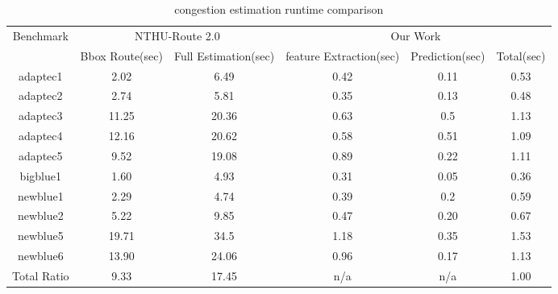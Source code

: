 \begin{table*}[htbp]
    \centering
    \caption{congestion estimation runtime comparison}
    \label{tab:runtime}
    \begin{tabular}{c|c|c|c|c|c}
        \toprule
        \multirow{2}{*}{Benchmark} & \multicolumn{2}{c|}{NTHU-Route 2.0 \cite{NTHU}} & \multicolumn{3}{c}{Our Work}        \\ \cline{2-6} 
                           & Bbox Route(sec)   & Full Estimation(sec)  & feature Extraction(sec) & Prediction(sec) & Total(sec) \\ \hline
        adaptec1           & 2.02         & 6.49             & 0.42                 & 0.11       & 0.53  \\ \hline
        adaptec2           & 2.74         & 5.81             & 0.35                 & 0.13       & 0.48  \\ \hline
        adaptec3           & 11.25        & 20.36            & 0.63                 & 0.5        & 1.13  \\ \hline
        adaptec4           & 12.16        & 20.62            & 0.58                 & 0.51       & 1.09  \\ \hline
        adaptec5           & 9.52         & 19.08            & 0.89                 & 0.22       & 1.11  \\ \hline
        bigblue1           & 1.60         & 4.93             & 0.31                 & 0.05       & 0.36  \\ \hline
        newblue1           & 2.29         & 4.74             & 0.39                 & 0.2        & 0.59  \\ \hline
        newblue2           & 5.22         & 9.85             & 0.47                 & 0.20       & 0.67  \\ \hline
        newblue5           & 19.71        & 34.5             & 1.18                 & 0.35       & 1.53  \\ \hline
        newblue6           & 13.90        & 24.06            & 0.96                 & 0.17       & 1.13  \\ \hline
        Total Ratio        & 9.33         & 17.45            & n/a                  & n/a        & 1.00 \\ \bottomrule
    \end{tabular}
\end{table*}

